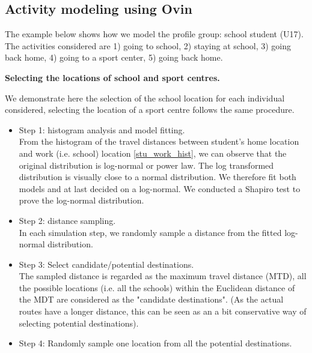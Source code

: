 \documentclass[]{article}
\begin{document}
\subsection{Activity modeling using Ovin}
The example below shows how we model the profile group: school student (U17). The activities considered are 1) going to school, 2) staying at school, 3) going back home, 4) going to a sport center, 5) going back home.  

\textbf{Selecting the locations of school and sport centres.}

We demonstrate here the selection of the school location for each individual considered, selecting the location of a sport centre follows the same procedure.   
\begin{itemize}
    \item Step 1: histogram analysis and model fitting. \\ From the histogram of the travel distances between student's home location and work (i.e. school) location \cref{stu_work_hist}, we can observe that the original distribution is log-normal or power law. The log transformed distribution is visually close to a normal distribution. We therefore fit both models and at last decided on a log-normal. We conducted a Shapiro test to prove the log-normal distribution.  
    
    \item Step 2: distance sampling. \\ In each simulation step, we randomly sample a distance from the fitted log-normal distribution.
    
    \item Step 3: Select candidate/potential destinations. \\ The sampled distance is regarded as the maximum travel distance (MTD), all the possible locations (i.e. all the schools) within the Euclidean distance of the MDT are considered as the "candidate destinations". (As the actual routes have a longer distance, this can be seen as an a bit conservative way of selecting potential destinations). 
    
    \item Step 4: Randomly sample one location from all the potential destinations.
    
\end{itemize}
\end{document}
